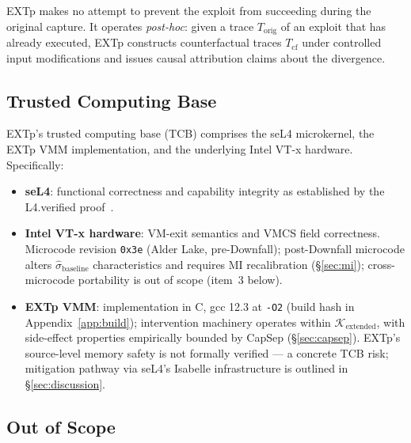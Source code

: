\documentclass[conference]{IEEEtran}
\newcommand{\Korig}{T_\text{orig}}
\newcommand{\Tcf}{T_\text{cf}}
\newcommand{\Kextended}{\mathcal{K}_\text{extended}}
\newcommand{\sigbase}{\hat{\sigma}_\text{baseline}}
\begin{document}
EXTp makes no attempt to prevent the exploit from succeeding during
the original capture. It operates \emph{post-hoc}: given a trace
$\Korig$ of an exploit that has already executed, EXTp constructs
counterfactual traces $\Tcf$ under controlled input modifications and
issues causal attribution claims about the divergence.

\subsection*{Trusted Computing Base}

EXTp's trusted computing base (TCB) comprises the seL4 microkernel,
the EXTp VMM implementation, and the underlying Intel VT-x hardware.
Specifically:
\begin{itemize}
\item \textbf{seL4}: functional correctness and capability integrity
  as established by the L4.verified
  proof~\cite{klein2009sel4,klein2014sel4}.
\item \textbf{Intel VT-x hardware}: VM-exit semantics and VMCS field
  correctness. Microcode revision \texttt{0x3e} (Alder Lake,
  pre-Downfall); post-Downfall microcode alters $\sigbase$
  characteristics and requires MI recalibration (\S\ref{sec:mi});
  cross-microcode portability is out of scope (item~3 below).
\item \textbf{EXTp VMM}: implementation in C, gcc 12.3 at
  \texttt{-O2} (build hash in Appendix~\ref{app:build}); intervention
  machinery operates within $\Kextended$, with side-effect properties
  empirically bounded by CapSep (\S\ref{sec:capsep}). EXTp's
  source-level memory safety is not formally verified --- a concrete
  TCB risk; mitigation pathway via seL4's Isabelle infrastructure is
  outlined in \S\ref{sec:discussion}.
\end{itemize}

\subsection*{Out of Scope}
\end{document}
